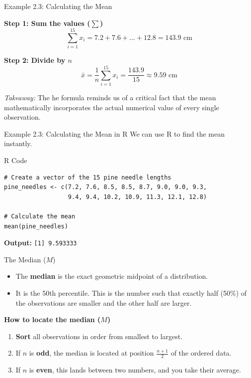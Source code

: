 \documentclass[aspectratio=169]{beamer}
\begin{document}
\begin{frame}{Example 2.3: Calculating the Mean}

\textbf{Step 1: Sum the values ($\sum$)}
$$ \sum_{i=1}^{15} x_i = 7.2 + 7.6 + \dots + 12.8 = 143.9 \text{ cm} $$

\textbf{Step 2: Divide by $n$}
$$ \bar{x} = \frac{1}{n} \sum_{i=1}^{15} x_i = \frac{143.9}{15} \approx 9.59 \text{ cm} $$

\vspace{0.3cm}

\emph{Takeaway:} The he formula reminds us of a critical fact that the mean mathematically incorporates the actual numerical value of every single observation.
\end{frame}

\begin{frame}[fragile]{Example 2.3: Calculating the Mean in R}
We can use R to find the mean instantly.

\vspace{0.1cm}

\begin{block}{R Code}
\begin{verbatim}
# Create a vector of the 15 pine needle lengths
pine_needles <- c(7.2, 7.6, 8.5, 8.5, 8.7, 9.0, 9.0, 9.3, 
                  9.4, 9.4, 10.2, 10.9, 11.3, 12.1, 12.8)

# Calculate the mean
mean(pine_needles)
\end{verbatim}
\end{block}
\textbf{Output:}
\texttt{[1] 9.593333}
\end{frame}

\begin{frame}{The Median ($M$)}
\begin{itemize}
	\item The \textbf{median} is the exact geometric midpoint of a distribution.
	\item It is the 50th percentile. This is the number such that exactly half (50\%) of the observations are smaller and the other half are larger.
\end{itemize}

\vspace{0.3cm}

\textbf{How to locate the median ($M$)}
\begin{enumerate}
	\item \textbf{Sort} all observations in order from smallest to largest.
	\item If $n$ is \textbf{odd}, the median is located at position \textbf{$\frac{n+1}{2}$} of the ordered data.
   	 \item If $n$ is \textbf{even}, this lands between two numbers, and you take their average.
\end{enumerate}
\end{frame}
\end{document}
